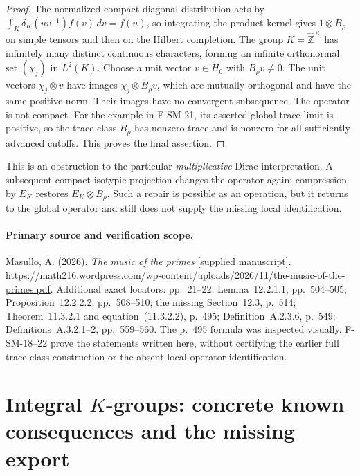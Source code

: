 \documentclass[11pt,a4paper]{article}
\theoremstyle{definition}\newtheorem{definition}[theorem]{Definition}
\theoremstyle{remark}\newtheorem{remark}[theorem]{Remark}
\begin{document}
\begin{proof}
The normalized compact diagonal distribution acts by
$\int_K\delta_K(uv^{-1})f(v)\,dv=f(u)$, so integrating
the product kernel gives $1\otimes B_\rho$ on simple
tensors and then on the Hilbert completion.
The group $K=\widehat{\mathbb Z}^{\,\times}$ has infinitely
many distinct continuous characters, forming an infinite
orthonormal set $(\chi_j)$ in $L^2(K)$.
Choose a unit vector $v\in H_0$ with $B_\rho v\ne0$.
The unit vectors $\chi_j\otimes v$ have images
$\chi_j\otimes B_\rho v$, which are mutually orthogonal
and have the same positive norm.  Their images have no
convergent subsequence.  The operator is not compact.
For the example in F-SM-21, its asserted global trace
limit is positive, so the trace-class $B_\rho$ has
nonzero trace and is nonzero for all sufficiently
advanced cutoffs.  This proves the final assertion.
\end{proof}

This is an obstruction to the particular \emph{multiplicative}
Dirac interpretation.  A subsequent compact-isotypic
projection changes the operator again: compression by $E_K$
restores $E_K\otimes B_\rho$.  Such a repair is possible
as an operation, but it returns to the global operator
and still does not supply the missing local identification.

\paragraph{Primary source and verification scope.}
Masullo, A. (2026). \emph{The music of the primes}
[supplied manuscript].
\url{https://math216.wordpress.com/wp-content/uploads/2026/11/the-music-of-the-primes.pdf}.
Additional exact locators: pp.~21--22; Lemma~12.2.1.1,
pp.~504--505; Proposition~12.2.2.2, pp.~508--510;
the missing Section~12.3, p.~514;
Theorem~11.3.2.1 and equation~(11.3.2.2), p.~495;
Definition~A.2.3.6, p.~549; Definitions~A.3.2.1--2,
pp.~559--560.  The p.~495 formula was inspected visually.
F-SM-18--22 prove the statements written here, without
certifying the earlier full trace-class construction or the
absent local-operator identification.


\section{Integral $K$-groups: concrete known consequences and the missing export}
\label{sec:source-K-bridge}
\end{document}
